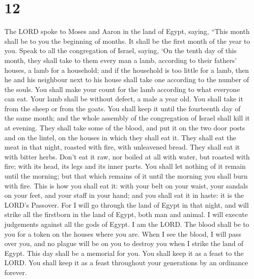 \hypertarget{section-11}{%
\section{12}\label{section-11}}

 The LORD spoke to Moses and Aaron in the land of Egypt,
saying,  ``This month shall be to you the beginning of
months. It shall be the first month of the year to you. 
Speak to all the congregation of Israel, saying, `On the tenth day of
this month, they shall take to them every man a lamb, according to their
fathers' houses, a lamb for a household;  and if the
household is too little for a lamb, then he and his neighbour next to
his house shall take one according to the number of the souls. You shall
make your count for the lamb according to what everyone can eat.
 Your lamb shall be without defect, a male a year old. You
shall take it from the sheep or from the goats.  You shall
keep it until the fourteenth day of the same month; and the whole
assembly of the congregation of Israel shall kill it at evening.
 They shall take some of the blood, and put it on the two
door posts and on the lintel, on the houses in which they shall eat it.
 They shall eat the meat in that night, roasted with fire,
with unleavened bread. They shall eat it with bitter herbs.
 Don't eat it raw, nor boiled at all with water, but
roasted with fire; with its head, its legs and its inner parts.
 You shall let nothing of it remain until the morning;
but that which remains of it until the morning you shall burn with fire.
 This is how you shall eat it: with your belt on your
waist, your sandals on your feet, and your staff in your hand; and you
shall eat it in haste: it is the LORD's Passover.  For I
will go through the land of Egypt in that night, and will strike all the
firstborn in the land of Egypt, both man and animal. I will execute
judgements against all the gods of Egypt. I am the LORD. 
The blood shall be to you for a token on the houses where you are. When
I see the blood, I will pass over you, and no plague will be on you to
destroy you when I strike the land of Egypt.  This day
shall be a memorial for you. You shall keep it as a feast to the LORD.
You shall keep it as a feast throughout your generations by an ordinance
forever.

